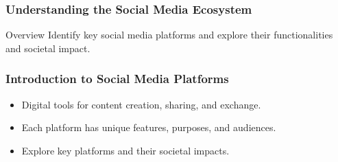 \documentclass{beamer}
\begin{document}
\begin{frame}[fragile]
    \frametitle{Understanding the Social Media Ecosystem}
    \begin{block}{Overview}
        Identify key social media platforms and explore their functionalities and societal impact.
    \end{block}
\end{frame}

\begin{frame}[fragile]
    \frametitle{Introduction to Social Media Platforms}
    \begin{itemize}
        \item Digital tools for content creation, sharing, and exchange.
        \item Each platform has unique features, purposes, and audiences.
        \item Explore key platforms and their societal impacts.
    \end{itemize}
\end{frame}
\end{document}
